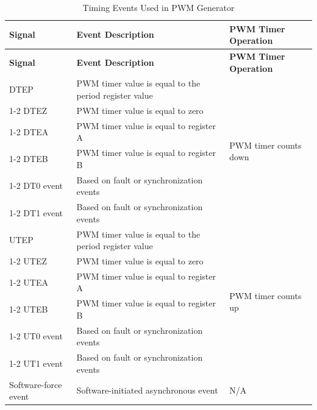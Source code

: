 \begin{longtable}{ |p{3.6cm}|p{8cm}|p{4cm}|}
    \caption{ Timing Events Used in PWM Generator}
    \label{tab:mcpwm-gen-in}
    \\\hline
    \rowcolor{lightgray}
    \textbf{Signal} & \textbf{Event Description} & \textbf{PWM Timer Operation} \\\hline
    \endfirsthead
    \hline
    \rowcolor{lightgray}   
    \textbf{Signal} & \textbf{Event Description} & \textbf{PWM Timer Operation} \\\hline
    \endhead
    \hline
    \endfoot
    DTEP 
    & PWM timer value is equal to the period register value
    & \multirow{6}{*}{PWM timer counts down}
    \\
    \cline{1-2}
    DTEZ
    & PWM timer value is equal to zero
    & 
    \\
    \cline{1-2}
    DTEA
    & PWM timer value is equal to register A 
    & 
    \\
    \cline{1-2}
    DTEB
    & PWM timer value is equal to register B
    & 
    \\
    \cline{1-2}
    DT0 event
    & Based on fault or synchronization events
    & 
    \\
    \cline{1-2}
    DT1 event
    & Based on fault or synchronization events
    & 
    \\\hline
    UTEP
    & PWM timer value is equal to the period register value
    & \multirow{6}{*}{PWM timer counts up}
    \\
    \cline{1-2}
    UTEZ
    & PWM timer value is equal to zero
    & 
    \\
    \cline{1-2}
    UTEA
    & PWM timer value is equal to register A
    & 
    \\
    \cline{1-2}
    UTEB
    & PWM timer value is equal to register B
    & 
    \\
    \cline{1-2}
    UT0 event
    & Based on fault or synchronization events
    & 
    \\
    \cline{1-2}
    UT1 event
    & Based on fault or synchronization events
    & 
    \\\hline
    Software-force event 
    & Software-initiated asynchronous event 
    & N/A
\end{longtable}
